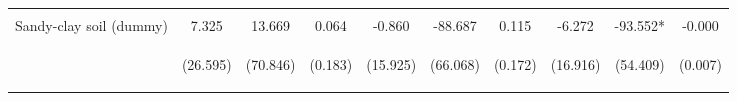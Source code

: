 \begin{center}
\begin{tabular}{lccccccccc}
\vspace{4pt} & \begin{footnotesize}[0.358]\end{footnotesize} & \begin{footnotesize}[0.673]\end{footnotesize} & \begin{footnotesize}[0.974]\end{footnotesize} & \begin{footnotesize}[0.779]\end{footnotesize} & \begin{footnotesize}[0.975]\end{footnotesize} & \begin{footnotesize}[0.056]\end{footnotesize} & \begin{footnotesize}[0.863]\end{footnotesize} & \begin{footnotesize}[0.012]\end{footnotesize} & \begin{footnotesize}[0.413]\end{footnotesize} \\
Sandy-clay soil (dummy) & 7.325 & 13.669 & 0.064 & -0.860 & -88.687 & 0.115 & -6.272 & -93.552* & -0.000 \\
 & \begin{footnotesize}(26.595)\end{footnotesize} & \begin{footnotesize}(70.846)\end{footnotesize} & \begin{footnotesize}(0.183)\end{footnotesize} & \begin{footnotesize}(15.925)\end{footnotesize} & \begin{footnotesize}(66.068)\end{footnotesize} & \begin{footnotesize}(0.172)\end{footnotesize} & \begin{footnotesize}(16.916)\end{footnotesize} & \begin{footnotesize}(54.409)\end{footnotesize} & \begin{footnotesize}(0.007)\end{footnotesize} \\

\end{tabular}
\end{center}
